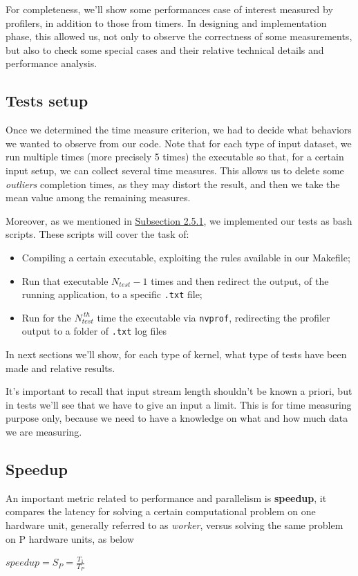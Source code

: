 For completeness, we'll show some performances case of interest measured by profilers, in addition to those from timers.
In designing and implementation phase, this allowed us, not only to observe the correctness of some measurements, but also to check some special cases and their relative technical details and performance analysis.


\subsection{Tests setup}
Once we determined the time measure criterion, we had to decide what behaviors we wanted to observe from our code.%
Note that for each type of input dataset, we run multiple times (more precisely 5 times) the executable so that, for a certain input setup, we can collect several time measures. This allows us to delete some \textit{outliers} completion times, as they may distort the result, and then we take the mean value among the remaining measures.

Moreover, as we mentioned in \hyperref[subs:bash]{Subsection 2.5.1}, we implemented our tests as bash scripts.
These scripts will cover the task of:
\begin{itemize}
	\item Compiling a certain executable, exploiting the rules available in our  Makefile;
	\item Run that executable \(N_{test} - 1\) times and then redirect the output, of the running application, to a specific \texttt{.txt} file;
	\item Run for the \(N_{test}^{\ th}\) time the executable via \texttt{nvprof}, redirecting the profiler output to a folder of \texttt{.txt} log files
\end{itemize} 
In next sections we'll show, for each type of kernel, what type of tests have been made and relative results.

It's important to recall that input stream length shouldn't be known a priori, but in tests we'll see that we have to give an input a limit. This is for time measuring purpose only, because we need to have a knowledge on what and how much data we are measuring.


\subsection{Speedup}
\label{subs:speedup}
An important metric related to performance and parallelism is \textbf{speedup}, it compares the latency for solving a certain computational problem on one hardware unit, generally referred to as \textit{worker}, versus solving the same problem on P hardware units, as below
\begin{center}
	\(speedup = S_{P} = \frac{T_{1}}{T_{P}} \)
\end{center}



